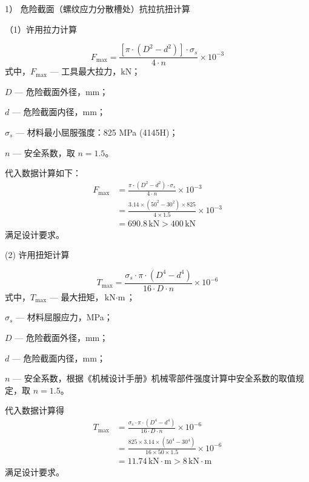 1） 危险截面（螺纹应力分散槽处）抗拉抗扭计算

（1）许用拉力计算

\begin{equation}
    F_{\max} = \frac{[\pi \cdot (D^2 - d^2)] \cdot \sigma_s}{4 \cdot n} \times 10^{-3}
\end{equation}
式中，$F_{\max}$ — 工具最大拉力，kN；

$D$ — 危险截面外径，mm；

$d$ — 危险截面内径，mm；

$\sigma_s$ — 材料最小屈服强度：825 MPa (4145H)；

$n$ — 安全系数，取 $n = 1.5$。

代入数据计算如下：
\begin{equation}
\begin{aligned}
    F_{\max} &= \frac{\pi \cdot (D^2 - d^2) \cdot \sigma_s}{4 \cdot n} \times 10^{-3} \\
             &= \frac{3.14 \times (50^2 - 30^2) \times 825}{4 \times 1.5} \times 10^{-3} \\
             &= 690.8 \, \text{kN} > 400 \, \text{kN}      
\end{aligned}
\end{equation}
满足设计要求。

(2) 许用扭矩计算

\begin{equation}
    T_{\max} = \frac{\sigma_s \cdot \pi \cdot (D^4 - d^4)}{16 \cdot D \cdot n} \times 10^{-6}
\end{equation}
式中，$T_{\max}$ — 最大扭矩，$\text{kN} \cdot \text{m}$；

$\sigma_s$ — 材料屈服应力，MPa；

$D$ — 危险截面外径，mm；

$d$ — 危险截面内径，mm；

$n$ — 安全系数，根据《机械设计手册》机械零部件强度计算中安全系数的取值规定\cite{ref26}，取 $n = 1.5$。

代入数据计算得
\begin{equation}
\begin{aligned}
    T_{\max} &= \frac{\sigma_s \cdot \pi \cdot (D^4 - d^4)}{16 \cdot D \cdot n} \times 10^{-6} \\
             &= \frac{825 \times 3.14 \times (50^4 - 30^4)}{16 \times 50 \times 1.5} \times 10^{-6} \\
             &= 11.74 \, \text{kN} \cdot \text{m} > 8 \, \text{kN} \cdot \text{m}
             
\end{aligned}
\end{equation}
满足设计要求。

